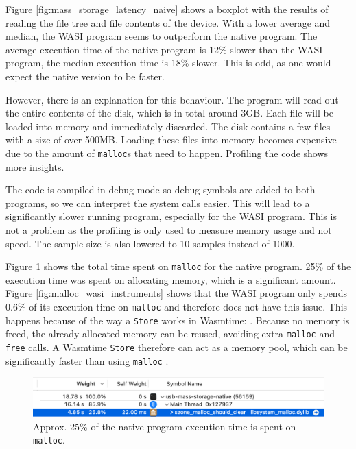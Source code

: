Figure \ref{fig:mass_storage_latency_naive} shows a boxplot with the results of reading the file tree and file contents of the device. With a lower average and median, the \acrshort{WASI} program seems to outperform the native program. The average execution time of the native program is 12\% slower than the \acrshort{WASI} program, the median execution time is 18\% slower. This is odd, as one would expect the native version to be faster.

However, there is an explanation for this behaviour. The program will read out the entire contents of the disk, which is in total around 3GB. Each file will be loaded into memory and immediately discarded. The disk contains a few files with a size of over 500MB. Loading these files into memory becomes expensive due to the amount of \texttt{malloc}s that need to happen. Profiling the code shows more insights.

The code is compiled in debug mode so debug symbols are added to both programs, so we can interpret the system calls easier. This will lead to a significantly slower running program, especially for the \acrshort{WASI} program. This is not a problem as the profiling is only used to measure memory usage and not speed. The sample size is also lowered to 10 samples instead of 1000.

Figure \ref{fig:malloc_instruments} shows the total time spent on \texttt{malloc} for the native program. 25\% of the execution time was spent on allocating memory, which is a significant amount. Figure \ref{fig:malloc_wasi_instruments} shows that the \acrshort{WASI} program only spends 0.6\% of its execution time on \texttt{malloc} and therefore does not have this issue. This happens because of the way a \texttt{Store} works in Wasmtime:  \cite{wasmtime_store}. Because no memory is freed, the already-allocated memory can be reused, avoiding extra \texttt{malloc} and \texttt{free} calls. A Wasmtime \texttt{Store} therefore can act as a memory pool, which can be significantly faster than using \texttt{malloc} \cite{memory_pool_wikipedia}.


\begin{figure}[H]
  \centering
  \includegraphics[width=1\textwidth]{images/malloc_screenshot.png}
  \caption{Approx. 25\% of the native program execution time is spent on \texttt{malloc}.}
  \label{fig:malloc_instruments}
\end{figure}

